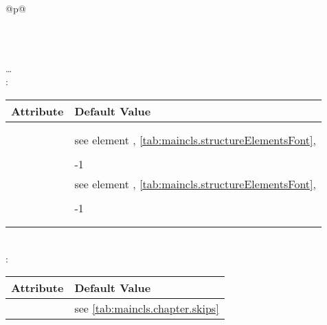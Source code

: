   \begin{longtable}{@{}p{\columnwidth}@{}}
    \caption{Default of the headings of  and
      }%
    \label{tab:maincls.section.defaults}\\
    \endfirsthead
    \caption[]{Default of the headings of  and
       \emph{(Continuation)}}\\
    \addlinespace[-\normalbaselineskip]
    \endhead
    \raggedleft\dots\\
    \endfoot
    \endlastfoot
    : \\*
    \begin{tabularx}{\linewidth}{ll}
    \toprule
    Attribute & Default Value \\
    \midrule
    \PValue{afterskip}   & \PValue{0pt plus 1fil} \\
    \PValue{beforeskip}  & \PValue{0pt plus 1fil + \Length{baselineskip}} \\
    \PValue{font}        & see element \DescRef{maincls.fontelement.part}, 
                           \autoref{tab:maincls.structureElementsFont}, 
                           \autopageref{tab:maincls.structureElementsFont} \\
    \PValue{innerskip}   & \PValue{20pt} \\
    \PValue{level}       & -1 \\
    \PValue{prefixfont}  & see element 
                           \DescRef{maincls.fontelement.partnumber},
                           \autoref{tab:maincls.structureElementsFont}, 
                           \autopageref{tab:maincls.structureElementsFont} \\
    \PValue{tocindent}   & \PValue{0pt} \\
    \PValue{toclevel}    & -1 \\
    \PValue{tocnumwidth} & \PValue{2em} \\
    \PValue{tocstyle}    & \PValue{part} \\
    \bottomrule
    \end{tabularx} \\
    \addlinespace[\normalbaselineskip]
    : \\*
    \begin{tabularx}{\linewidth}{ll}
    \toprule
    Attribute & Default Value \\
    \midrule
    \PValue{afterskip}   & see \autoref{tab:maincls.chapter.skips} \\

\end{tabularx}
\end{longtable}
